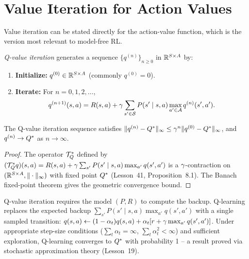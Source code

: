 \documentclass[11pt,a4paper]{article}
\begin{document}
\section{Value Iteration for Action Values}
\label{sec:vi-q}

Value iteration can be stated directly for the action-value function,
which is the version most relevant to model-free RL.

\begin{definition}
\label{def:q-vi}
\emph{Q-value iteration} generates a sequence
$\{q^{(n)}\}_{n \geq 0}$ in $\mathbb{R}^{S \times A}$ by:
\begin{enumerate}[nosep]
    \item \textbf{Initialize:} $q^{(0)} \in \mathbb{R}^{S \times A}$
    (commonly $q^{(0)} = 0$).
    \item \textbf{Iterate:} For $n = 0, 1, 2, \ldots$,
    \[
        q^{(n+1)}(s,a) = R(s,a) + \gamma \sum_{s' \in \mathcal{S}}
        P(s' \mid s,a) \max_{a' \in \mathcal{A}} q^{(n)}(s', a').
    \]
\end{enumerate}
\end{definition}

\begin{proposition}
\label{prop:q-vi-convergence}
The Q-value iteration sequence satisfies
$\|q^{(n)} - Q^*\|_\infty \leq
\gamma^n \|q^{(0)} - Q^*\|_\infty$, and
$q^{(n)} \to Q^*$ as $n \to \infty$.
\end{proposition}

\begin{proof}
The operator $\mathcal{T}^*_Q$ defined by
$(\mathcal{T}^*_Q q)(s,a) = R(s,a) + \gamma \sum_{s'} P(s' \mid s,a)
\max_{a'} q(s',a')$ is a $\gamma$-contraction on
$(\mathbb{R}^{S \times A}, \|\cdot\|_\infty)$ with fixed point $Q^*$
(Lesson~41, Proposition~8.1). The Banach fixed-point theorem gives
the geometric convergence bound.
\end{proof}

\begin{rlconnection}[title={From Q-Value Iteration to Q-Learning}]
Q-value iteration requires the model $(P, R)$ to compute the backup.
Q-learning replaces the expected backup
$\sum_{s'} P(s' \mid s,a) \max_{a'} q(s',a')$ with a single
sampled transition: $q(s,a) \leftarrow (1-\alpha_t) q(s,a) +
\alpha_t [r + \gamma \max_{a'} q(s',a')]$. Under appropriate
step-size conditions ($\sum_t \alpha_t = \infty$,
$\sum_t \alpha_t^2 < \infty$) and sufficient exploration,
Q-learning converges to $Q^*$ with probability 1 -- a result
proved via stochastic approximation theory (Lesson~19).
\end{rlconnection}
\end{document}
